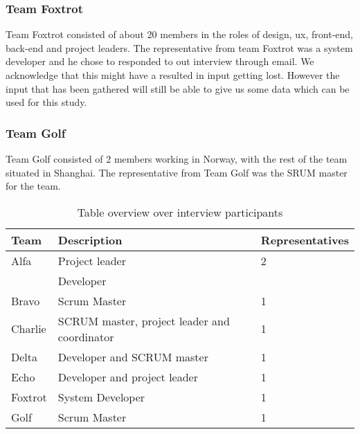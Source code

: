 \subsubsection{Team Foxtrot}
Team Foxtrot consisted of about 20 members in the roles of design, ux, front-end, back-end and project leaders. The representative from team Foxtrot was a system developer and he chose to responded to out interview through email. We acknowledge that this might have a resulted in input getting lost. However the input that has been gathered will still be able to give us some data which can be used for this study. 

\subsubsection{Team Golf}
Team Golf consisted of 2 members working in Norway, with the rest of the team situated in Shanghai. The representative from Team Golf was the SRUM master for the team. 

\begin{table}[!h]
	\begin{center}
	\caption{Table overview over interview participants}
	\label{table:participants}
	\begin{tabular}{l p{} l}
	\hline
	Team & Description & Representatives\\
	\hline
	Alfa & Project leader & 2 \\
	& Developer & \\
	Bravo & Scrum Master & 1  \\
	Charlie & SCRUM master, project leader and coordinator & 1 \\
	Delta & Developer and SCRUM master & 1 \\
	Echo & Developer and project leader & 1 \\
	Foxtrot & System Developer & 1 \\
	Golf & Scrum Master & 1 \\
	\hline
	\end{tabular}
	\end{center}
\end{table}

\clearpage